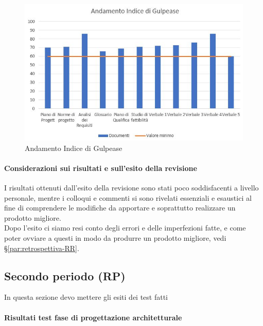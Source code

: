 \documentclass[../piano_di_qualifica.tex]{subfiles}
\begin{document}
\begin{figure}[H]
	\centering
	\includegraphics[width=12cm]{img/media_gul.jpg}
	\caption{ Andamento Indice di Gulpease}
\end{figure}

\paragraph{Considerazioni sui risultati e sull’esito della revisione }
I risultati ottenuti dall’esito della revisione sono stati poco soddisfacenti a livello personale, 
mentre i colloqui e commenti si sono rivelati essenziali e esaustici al fine di comprendere le modifiche da apportare
e soprattutto realizzare un prodotto migliore. \\
Dopo l'esito ci siamo resi conto degli errori e delle imperfezioni fatte, 
e come poter ovviare a questi in modo da produrre un prodotto migliore, vedi \S\ref{par:retrospettiva-RR}. \\


\subsection{Secondo periodo (RP)}
\label{sub:periodo-RP}
In questa sezione devo mettere gli esiti dei test fatti
\paragraph{Risultati test fase di progettazione architetturale}
\end{document}
